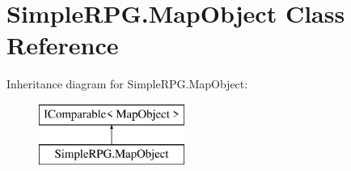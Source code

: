 \hypertarget{class_simple_r_p_g_1_1_map_object}{\section{Simple\+R\+P\+G.\+Map\+Object Class Reference}
\label{class_simple_r_p_g_1_1_map_object}
}
Inheritance diagram for Simple\+R\+P\+G.\+Map\+Object\+:\begin{figure}[H]
\begin{center}
\leavevmode
\includegraphics[height=2.000000cm]{class_simple_r_p_g_1_1_map_object}
\end{center}
\end{figure}
